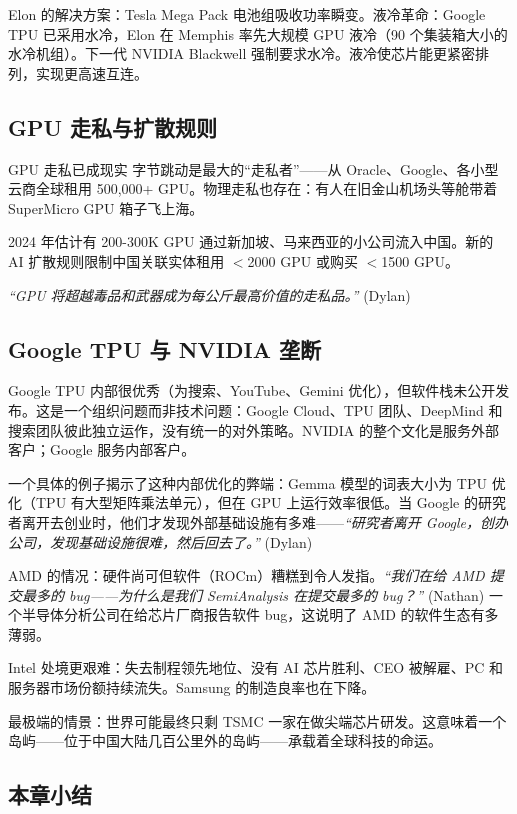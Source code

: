 \documentclass[a4paper]{article}
\begin{document}
Elon 的解决方案：Tesla Mega Pack 电池组吸收功率瞬变。液冷革命：Google TPU 已采用水冷，Elon 在 Memphis 率先大规模 GPU 液冷（90 个集装箱大小的水冷机组）。下一代 NVIDIA Blackwell 强制要求水冷。液冷使芯片能更紧密排列，实现更高速互连。

\subsection{GPU 走私与扩散规则}

\begin{warningbox}{GPU 走私已成现实}
字节跳动是最大的``走私者''——从 Oracle、Google、各小型云商全球租用 500,000+ GPU。物理走私也存在：有人在旧金山机场头等舱带着 SuperMicro GPU 箱子飞上海。

2024 年估计有 200-300K GPU 通过新加坡、马来西亚的小公司流入中国。新的 AI 扩散规则限制中国关联实体租用 $<$2000 GPU 或购买 $<$1500 GPU。

\textit{``GPU 将超越毒品和武器成为每公斤最高价值的走私品。''} (Dylan)
\end{warningbox}

\subsection{Google TPU 与 NVIDIA 垄断}

Google TPU 内部很优秀（为搜索、YouTube、Gemini 优化），但软件栈未公开发布。这是一个组织问题而非技术问题：Google Cloud、TPU 团队、DeepMind 和搜索团队彼此独立运作，没有统一的对外策略。NVIDIA 的整个文化是服务外部客户；Google 服务内部客户。

一个具体的例子揭示了这种内部优化的弊端：Gemma 模型的词表大小为 TPU 优化（TPU 有大型矩阵乘法单元），但在 GPU 上运行效率很低。当 Google 的研究者离开去创业时，他们才发现外部基础设施有多难——\textit{``研究者离开 Google，创办公司，发现基础设施很难，然后回去了。''} (Dylan)

AMD 的情况：硬件尚可但软件（ROCm）糟糕到令人发指。\textit{``我们在给 AMD 提交最多的 bug——为什么是我们 SemiAnalysis 在提交最多的 bug？''} (Nathan) 一个半导体分析公司在给芯片厂商报告软件 bug，这说明了 AMD 的软件生态有多薄弱。

Intel 处境更艰难：失去制程领先地位、没有 AI 芯片胜利、CEO 被解雇、PC 和服务器市场份额持续流失。Samsung 的制造良率也在下降。

最极端的情景：世界可能最终只剩 TSMC 一家在做尖端芯片研发。这意味着一个岛屿——位于中国大陆几百公里外的岛屿——承载着全球科技的命运。

\subsection{本章小结}
\end{document}
